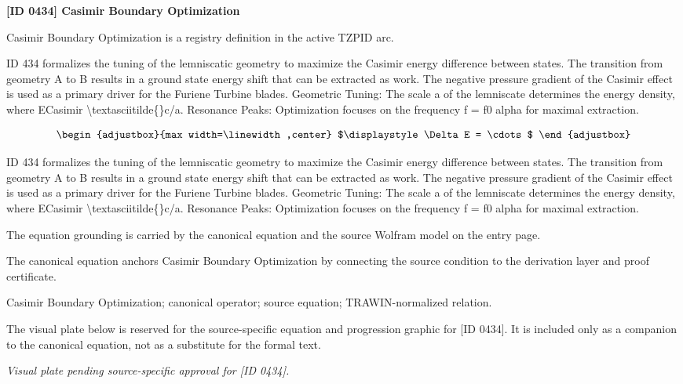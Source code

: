 \clearpage
\noindent\textbf{[ID 0434] Casimir Boundary Optimization}\par
\vspace{0.35em}
\begingroup\small
{}
Casimir Boundary Optimization is a registry definition in the active TZPID arc.

ID 434 formalizes the tuning of the lemniscatic geometry to maximize the Casimir energy difference between states. The transition from geometry A to B results in a ground state energy shift that can be extracted as work. The negative pressure gradient of the Casimir effect is used as a primary driver for the Furiene Turbine blades. Geometric Tuning: The scale a of the lemniscate determines the energy density, where ECasimir \textbackslash{}textasciitilde\{\}c/a. Resonance Peaks: Optimization focuses on the frequency f = f0 alpha for maximal extraction.

\[
\begin{adjustbox}{max width=\linewidth,center}
$\displaystyle
\Delta E = \cdots
$
\end{adjustbox}
\]

ID 434 formalizes the tuning of the lemniscatic geometry to maximize the Casimir energy difference between states. The transition from geometry A to B results in a ground state energy shift that can be extracted as work. The negative pressure gradient of the Casimir effect is used as a primary driver for the Furiene Turbine blades. Geometric Tuning: The scale a of the lemniscate determines the energy density, where ECasimir \textbackslash{}textasciitilde\{\}c/a. Resonance Peaks: Optimization focuses on the frequency f = f0 alpha for maximal extraction.

The equation grounding is carried by the canonical equation and the source Wolfram model on the entry page.

The canonical equation anchors Casimir Boundary Optimization by connecting the source condition to the derivation layer and proof certificate.

Casimir Boundary Optimization; canonical operator; source equation; TRAWIN-normalized relation.
\endgroup

\begingroup\footnotesize\sloppy
The visual plate below is reserved for the source-specific equation and progression graphic for [ID 0434]. It is included only as a companion to the canonical equation, not as a substitute for the formal text.
\par\endgroup
\begingroup\footnotesize\itshape
Visual plate pending source-specific approval for [ID 0434].
\par\endgroup

